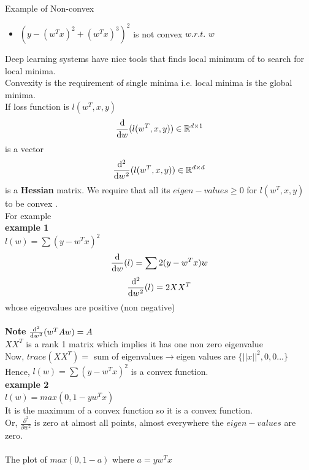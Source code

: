 \documentclass[12pt]{article}
\begin{document}
Example of Non-convex
\begin{itemize}
    \item $(y-({w^T}x)^2+({w^T}x)^3)^2$ is not convex $w.r.t.$ $w$\\
\end{itemize}

Deep learning systems have nice tools that finds local minimum of to search for local minima.\\
Convexity is the requirement of single minima i.e. local minima is the global minima.\\
If loss function is $l(w^T,x,y)$\\

$$\diff*{(l(w^T,x,y))}w \in {\mathbb{R}}^{d\times1}$$ is a vector\\
$$\diff*[2]{(l(w^T,x,y))}{w}\in {\mathbb{R}}^{d\times{d}}$$ is a \textbf{Hessian} matrix.  We require that all its $eigen-values \geq 0$ for $l(w^T,x,y)$ to be convex . \\
For example\\
\textbf{example 1}\\
$l(w)=\sum{(y-{w^T}x)}^2$\\
$${\diff*{(l)}w}=\sum{2(y-{w^T}x)w}$$ 
$$\diff*[2]{(l)}{w}=2XX^T$$ whose eigenvalues are positive (non negative)\\
\\
\textbf{Note } $\diff*[2]{({w^T}Aw)}{w}=A$\\
$XX^T$ is a rank 1 matrix which implies it has one non zero eigenvalue\\
Now, $trace(XX^T) =$ sum of eigenvalues$\rightarrow{}$eigen values are $\{{||x||}^2,0,0 ...\}$\\
Hence, $l(w)=\sum{(y-{w^T}x)}^2$ is a convex function.
\\
\textbf{example 2} \\
$l(w)=max(0,1-y{w^T}x)$\\
It is the maximum of a convex function so it is a convex function.\\
Or, $\frac{\partial^2 {}}{\partial w^2}$ is zero at almost all points, almost everywhere the $eigen-values$ are zero.\\
\\
The plot of $max(0,1-a)$  where $a=y{w^T}x$\\
\end{document}
